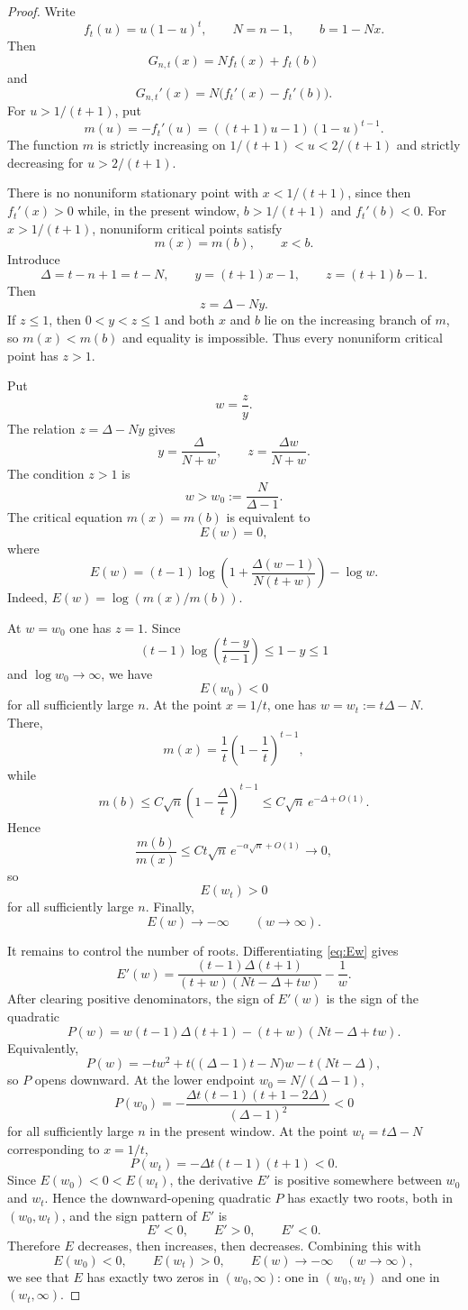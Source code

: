 \documentclass[11pt]{article}
\theoremstyle{definition}
\begin{document}
\begin{proof}
Write
\[
  f_t(u)=u(1-u)^t,
  \qquad N=n-1,
  \qquad b=1-Nx.
\]
Then
\[
  G_{n,t}(x)=Nf_t(x)+f_t(b)
\]
and
\[
  G_{n,t}'(x)=N\bigl(f_t'(x)-f_t'(b)\bigr).
\]
For $u>1/(t+1)$, put
\[
  m(u)=-f_t'(u)=((t+1)u-1)(1-u)^{t-1}.
\]
The function $m$ is strictly increasing on $1/(t+1)<u<2/(t+1)$ and strictly decreasing for $u>2/(t+1)$.

There is no nonuniform stationary point with $x<1/(t+1)$, since then $f_t'(x)>0$ while, in the present window, $b>1/(t+1)$ and $f_t'(b)<0$. For $x>1/(t+1)$, nonuniform critical points satisfy
\[
  m(x)=m(b),\qquad x<b.
\]
Introduce
\[
  \Delta=t-n+1=t-N,
  \qquad
  y=(t+1)x-1,
  \qquad
  z=(t+1)b-1.
\]
Then
\[
  z=\Delta-Ny.
\]
If $z\le 1$, then $0<y<z\le 1$ and both $x$ and $b$ lie on the increasing branch of $m$, so $m(x)<m(b)$ and equality is impossible. Thus every nonuniform critical point has $z>1$.

Put
\[
  w=\frac zy.
\]
The relation $z=\Delta-Ny$ gives
\[
  y=\frac{\Delta}{N+w},
  \qquad
  z=\frac{\Delta w}{N+w}.
\]
The condition $z>1$ is
\[
  w>w_0:=\frac{N}{\Delta-1}.
\]
The critical equation $m(x)=m(b)$ is equivalent to
\[
  E(w)=0,
\]
where
\begin{equation}\label{eq:Ew}
  E(w)=(t-1)\log\left(1+\frac{\Delta(w-1)}{N(t+w)}\right)-\log w.
\end{equation}
Indeed, $E(w)=\log(m(x)/m(b))$.

At $w=w_0$ one has $z=1$. Since
\[
  (t-1)\log\left(\frac{t-y}{t-1}\right)\le 1-y\le 1
\]
and $\log w_0\to\infty$, we have
\[
  E(w_0)<0
\]
for all sufficiently large $n$. At the point $x=1/t$, one has $w=w_t:=t\Delta-N$. There,
\[
  m(x)=\frac1t\left(1-\frac1t\right)^{t-1},
\]
while
\[
  m(b)\le C\sqrt n\left(1-\frac{\Delta}{t}\right)^{t-1}
      \le C\sqrt n\,e^{-\Delta+O(1)}.
\]
Hence
\[
  \frac{m(b)}{m(x)}\le C t\sqrt n\,e^{-\alpha\sqrt n+O(1)}\to 0,
\]
so
\[
  E(w_t)>0
\]
for all sufficiently large $n$. Finally,
\[
  E(w)\to -\infty\qquad(w\to\infty).
\]

It remains to control the number of roots. Differentiating \eqref{eq:Ew} gives
\[
  E'(w)=
  \frac{(t-1)\Delta(t+1)}{(t+w)(Nt-\Delta+tw)}-\frac1w.
\]
After clearing positive denominators, the sign of $E'(w)$ is the sign of the quadratic
\[
  P(w)=w(t-1)\Delta(t+1)-(t+w)(Nt-\Delta+tw).
\]
Equivalently,
\[
  P(w)=-tw^2+t\bigl((\Delta-1)t-N\bigr)w-t(Nt-\Delta),
\]
so $P$ opens downward. At the lower endpoint $w_0=N/(\Delta-1)$,
\[
  P(w_0)=-\frac{\Delta t(t-1)(t+1-2\Delta)}{(\Delta-1)^2}<0
\]
for all sufficiently large $n$ in the present window. At the point $w_t=t\Delta-N$ corresponding to $x=1/t$,
\[
  P(w_t)=-\Delta t(t-1)(t+1)<0.
\]
Since $E(w_0)<0<E(w_t)$, the derivative $E'$ is positive somewhere between $w_0$ and $w_t$. Hence the downward-opening quadratic $P$ has exactly two roots, both in $(w_0,w_t)$, and the sign pattern of $E'$ is
\[
  E'<0,\qquad E'>0,\qquad E'<0.
\]
Therefore $E$ decreases, then increases, then decreases. Combining this with
\[
  E(w_0)<0,\qquad E(w_t)>0,\qquad E(w)\to -\infty
  \quad (w\to\infty),
\]
we see that $E$ has exactly two zeros in $(w_0,\infty)$: one in $(w_0,w_t)$ and one in $(w_t,\infty)$.


\end{proof}
\end{document}
